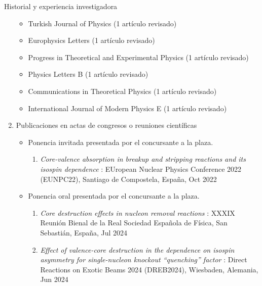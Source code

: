 \documentclass{resume2} %
\begin{document}
\begin{rSection}{Historial y experiencia investigadora}
\begin{enumerate}[label=\alph*.]
\begin{itemize}
\item Turkish Journal of Physics (1 art\'iculo revisado)

\item Europhysics Letters (1 art\'iculo revisado)

\item Progress in Theoretical and Experimental Physics (1 art\'iculo revisado)

\item Physics Letters B (1 art\'iculo revisado)

\item Communications in Theoretical Physics (1 art\'iculo revisado)

\item International Journal of Modern Physics E (1 art\'iculo revisado)

\end{itemize}

\item Publicaciones en actas de congresos o reuniones científicas

\begin{itemize}
\item Ponencia invitada presentada por el concursante a la plaza.
\begin{enumerate}[label=\arabic*.]
\item {\it Core-valence absorption in breakup and stripping reactions and its
isospin dependence} 
: EUropean Nuclear Physics Conference 2022 (EUNPC22), Santiago de Compostela, Espa\~na, Oct 2022
\end{enumerate}

\item Ponencia oral presentada por el concursante a la plaza.

\begin{enumerate}[label=\arabic*.]

\item {\it Core destruction effects in nucleon removal reactions} 
: XXXIX Reuni\'on Bienal de la Real Sociedad Española de F\'isica, San Sebasti\'an, Espa\~na, Jul 2024

\item {\it Effect of valence-core destruction in the dependence on isospin asymmetry for single-nucleon knockout “quenching” factor} 
: Direct Reactions on Exotic Beams 2024 (DREB2024), Wiesbaden, Alemania, Jun 2024




\end{enumerate}
\end{itemize}
\end{enumerate}
\end{rSection}
\end{document}
